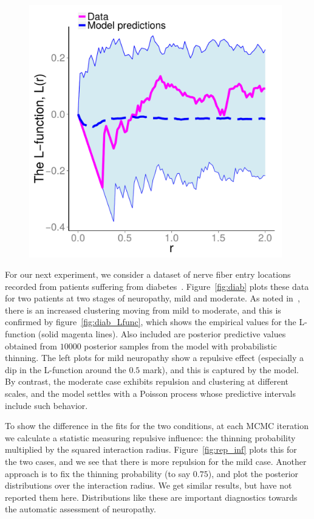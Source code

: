 \documentclass{statsoc}
\begin{document}
\begin{figure}
\begin{minipage}[h]{0.6\linewidth}
\begin{minipage}[h]{0.49\linewidth}
  \end{minipage}
  \begin{minipage}[h]{0.49\linewidth}
  \centering
  \includegraphics[width=0.98\textwidth]{figs/mod1_gibbs_Lfunc.pdf}
  \end{minipage}
  \end{minipage}
  \end{figure}
For our next experiment, we consider a dataset of nerve fiber entry locations recorded from patients suffering from diabetes~\citep{WallSar11}.
Figure~\ref{fig:diab} plots these data for two patients at two stages of neuropathy, mild and moderate.
  As noted in~\cite{WallSar11}, there is an increased clustering moving from mild to moderate, and this is confirmed by figure~\ref{fig:diab_Lfunc}, 
  which shows the empirical values for the L-function (solid magenta lines).
  Also included are posterior predictive values obtained from $10000$ posterior samples from the \matern model with probabilistic
  thinning. 
  The left plots for mild neuropathy show a repulsive effect (especially a dip in the L-function  around 
  the $0.5$ mark), and this is captured by the model. 
  By contrast, the moderate case exhibits repulsion and clustering at different scales, and the model settles with a Poisson process whose
  predictive intervals include such behavior.

To show the difference in the fits for the two conditions, at each MCMC iteration we calculate a statistic measuring repulsive influence: the thinning 
probability multiplied by the squared interaction radius. Figure~\ref{fig:rep_inf} plots this for the two cases, and we see that there is more
repulsion for the mild case. Another approach is to fix the thinning probability (to say $0.75$), and plot the posterior distributions over the
interaction radius. We get similar results, but have not reported them here. Distributions like these are important diagnostics towards
the automatic assessment of neuropathy.
\end{document}
